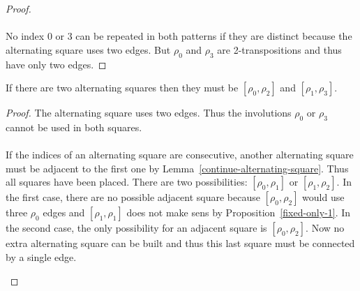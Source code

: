 \begin{proof}
  \paragraph{}
  No index 0 or 3 can be repeated in both patterns if they are distinct because the alternating square uses two edges. But $\rho_0$ and $\rho_3$ are 2-transpositions and thus have only two edges.

\end{proof}

\begin{lemma}
  If there are two alternating squares then they must be $[\rho_0, \rho_2]$ and $[\rho_1, \rho_3]$.
\end{lemma}

\begin{proof}
  The alternating square uses two edges. Thus the involutions $\rho_0$ or $\rho_3$ cannot be used in both squares.

  \paragraph{}
  If the indices of an alternating square are consecutive, another alternating square must be adjacent to the first one by Lemma~\ref{continue-alternating-square}. Thus all squares have been placed. There are two possibilities: $[\rho_0, \rho_1]$ or $[\rho_1, \rho_2]$. In the first case, there are no possible adjacent square because $[\rho_0, \rho_2]$ would use three $\rho_0$ edges and $[\rho_1, \rho_1]$ does not make sens by Proposition~\ref{fixed-only-1}. In the second case, the only possibility for an adjacent square is $[\rho_0, \rho_2]$. Now no extra alternating square can be built and thus this last square must be connected by a single edge.

  \begin{figure}[H]
    \begin{center}
\end{center}
\end{figure}
\end{proof}
